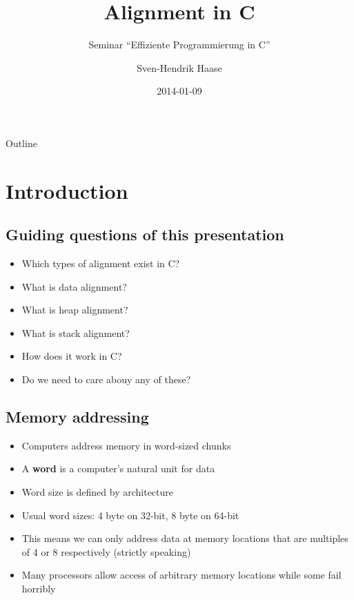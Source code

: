 \documentclass{beamer}
\begin{document}
\title{Alignment in C}
\subtitle{Seminar ``Effiziente Programmierung in C''}
\date{2014-01-09}
\author{Sven-Hendrik Haase}

\begin{frame}
    \titlepage
\end{frame}

\begin{frame}{Outline}
    \tiny
    \tableofcontents
\end{frame}

\section{Introduction}
\subsection{Guiding questions of this presentation}
\begin{frame}{\insertsection}{\insertsubsection}
	\begin{itemize}
		\item Which types of alignment exist in C?\pause
		\item What is data alignment?\pause
		\item What is heap alignment?\pause
		\item What is stack alignment?\pause
        \item How does it work in C?\pause
        \item Do we need to care abouy any of these?
	\end{itemize}
\end{frame}

\subsection{Memory addressing}
\begin{frame}{\insertsection}{\insertsubsection}
	\begin{itemize}
		\item Computers address memory in word-sized chunks\pause
		\item A \textbf{word} is a computer's natural unit for data
		\item Word size is defined by architecture
		\item Usual word sizes: 4 byte on 32-bit, 8 byte on 64-bit\pause
		\item This means we can only address data at memory locations that are
			  multiples of 4 or 8 respectively (strictly speaking)
        \item Many processors allow access of arbitrary memory locations while some fail
            horribly
	\end{itemize}
\end{frame}
\end{document}
